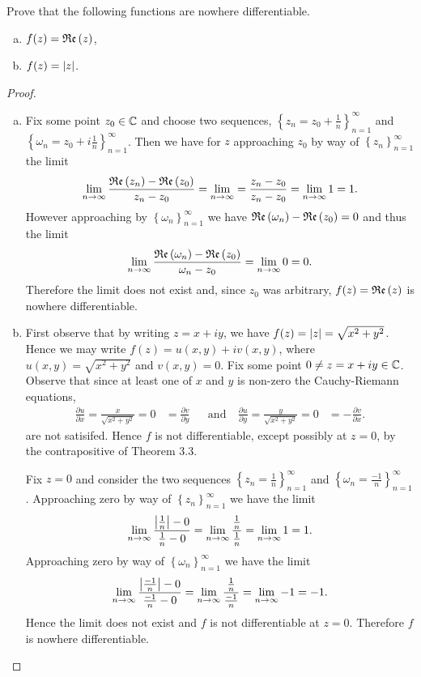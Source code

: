 \documentclass[12pt]{amsart}
\begin{document}
\begin{thm}
  Prove that the following functions are nowhere differentiable.
  \begin{enumerate}[(a)]
    \item
      $f(z) = \operatorname{\mathfrak{Re}}\left(z\right)$,
    \item
      $f(z) = \left| z \right|$.
  \end{enumerate}
  \begin{proof}
    \begin{enumerate}[(a)]
    \item
      Fix some point $z_0 \in \mathbb{C}$ and choose two sequences, $\left\{z_n = z_0 + \frac{1}{n}\right\}_{n=1}^\infty$ and $\left\{\omega_n = z_0 + i\frac{1}{n}\right\}_{n=1}^\infty$.
      Then we have for $z$ approaching $z_0$ by way of $\left\{z_n\right\}_{n=1}^\infty$ the limit
      $$\lim_{n \rightarrow \infty} \frac{\operatorname{\mathfrak{Re}}\left(z_n\right) - \operatorname{\mathfrak{Re}}\left(z_0\right)}{z_n - z_0} = \lim_{n\rightarrow \infty} = \frac{z_n - z_0}{z_n - z_0} = \lim_{n \rightarrow \infty} 1 = 1.$$
      However approaching by $\left\{\omega_n\right\}_{n=1}^\infty$ we have $\operatorname{\mathfrak{Re}}\left(\omega_n\right) - \operatorname{\mathfrak{Re}}\left(z_0\right) = 0$ and thus the limit
      $$\lim_{n \rightarrow \infty} \frac{\operatorname{\mathfrak{Re}}\left(\omega_n\right) - \operatorname{\mathfrak{Re}}\left(z_0\right)}{\omega_n - z_0} = \lim_{n\rightarrow \infty} 0 = 0.$$
      Therefore the limit does not exist and, since $z_0$ was arbitrary, $f(z) = \operatorname{\mathfrak{Re}}\left(z\right)$ is nowhere differentiable.
    \item
      First observe that by writing $z = x + iy$, we have $f(z) = \left| z \right| = \sqrt{x^2 + y^2}$.
      Hence we may write $f(z) = u(x,y) + iv(x,y)$, where $u(x,y) = \sqrt{x^2 + y^2}$ and $v(x,y) = 0$.
      Fix some point $0 \neq z = x + iy \in \mathbb{C}$.
      Observe that since at least one of $x$ and $y$ is non-zero the Cauchy-Riemann equations,
      \begin{align*}
        \frac{\partial u}{\partial x} = \frac{x}{\sqrt{x^2 + y^2}} = 0& = \frac{\partial v}{\partial y} &&\text{and}\ & \frac{\partial u}{\partial y} = \frac{y}{\sqrt{x^2 + y^2}} = 0 &= -\frac{\partial v}{\partial x}.
      \end{align*}
      are not satisifed.
      Hence $f$ is not differentiable, except possibly at $z = 0$, by the contrapositive of Theorem 3.3.
      
      Fix $z = 0$ and consider the two sequences $\left\{z_n = \frac{1}{n} \right\}_{n=1}^\infty$ and $\left\{ \omega_n = \frac{-1}{n} \right\}_{n=1}^\infty$.
      Approaching zero by way of $\left\{z_n\right\}_{n=1}^\infty$ we have the limit
      $$\lim_{n \rightarrow \infty} \frac{\left| \frac{1}{n} \right| - 0}{\frac{1}{n} - 0} = \lim_{n \rightarrow \infty} \frac{\frac{1}{n}}{\frac{1}{n}} = \lim_{n \rightarrow \infty} 1 = 1.$$
      Approaching zero by way of $\left\{\omega_n\right\}_{n=1}^\infty$ we have the limit
      $$\lim_{n \rightarrow \infty} \frac{\left| \frac{-1}{n} \right| - 0}{\frac{-1}{n} - 0} = \lim_{n \rightarrow \infty} \frac{\frac{1}{n}}{\frac{-1}{n}} = \lim_{n \rightarrow \infty} -1 = -1.$$
      Hence the limit does not exist and $f$ is not differentiable at $z = 0$.
      Therefore $f$ is nowhere differentiable.
    \end{enumerate}
  \end{proof}
\end{thm}
\end{document}
